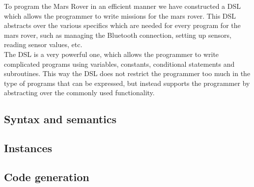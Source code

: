 To program the Mars Rover in an efficient manner we have constructed a DSL which
allows the programmer to write missions for the mars rover. This DSL abstracts
over the various specifics which are needed for every program for the mars 
rover, such as managing the Bluetooth connection, setting up sensors, reading
sensor values, etc. \\  

The DSL is a very powerful one, which allows the programmer to write complicated
programs using variables, constants, conditional statements and subroutines. 
This way the DSL does not restrict the programmer too much in the type of 
programs that can be expressed, but instead supports the programmer by 
abstracting over the commonly used functionality. \\

\subsection{Syntax and semantics}


\subsection{Instances}


\subsection{Code generation}

